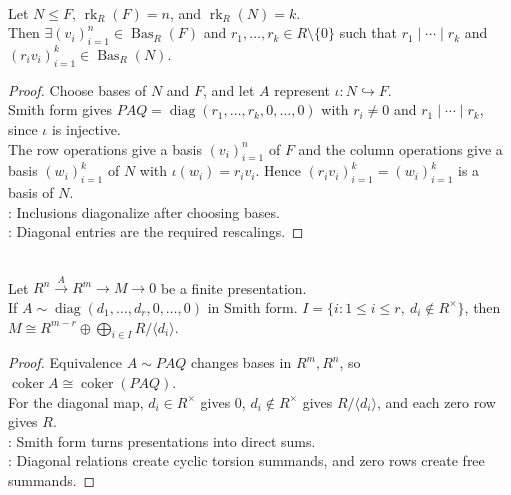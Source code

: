 \begin{theorem} \label{thm:adapted-basis-submodule-free-pid} \\
Let $N\leq F$, $\operatorname{rk}_R(F)=n$, and $\operatorname{rk}_R(N)=k$.\\
Then $\exists(v_i)_{i=1}^n\in\operatorname{Bas}_R(F)$ and $r_1,\ldots,r_k\in R\setminus\{0\}$ such that $r_1\mid\cdots\mid r_k$ and $(r_iv_i)_{i=1}^k\in\operatorname{Bas}_R(N)$.
\begin{proof}
Choose bases of $N$ and $F$, and let $A$ represent $\iota:N\hookrightarrow F$.\\
Smith form gives $PAQ=\operatorname{diag}(r_1,\ldots,r_k,0,\ldots,0)$ with $r_i\neq0$ and $r_1\mid\cdots\mid r_k$, since $\iota$ is injective.\\
The row operations give a basis $(v_i)_{i=1}^n$ of $F$ and the column operations give a basis $(w_i)_{i=1}^k$ of $N$ with $\iota(w_i)=r_iv_i$. Hence $(r_iv_i)_{i=1}^k=(w_i)_{i=1}^k$ is a basis of $N$.\\
: Inclusions diagonalize after choosing bases.\\
: Diagonal entries are the required rescalings.
\end{proof}
\end{theorem}

\begin{corollary} \label{cor:smith-normal-form-presents-pid-modules} \\
Let $R^n\xrightarrow{A}R^m\to M\to0$ be a finite presentation.\\
If $A\sim\operatorname{diag}(d_1,\ldots,d_r,0,\ldots,0)$ in Smith form. $I=\{i:1\leq i\leq r,\ d_i\notin R^\times\}$, then $M\cong R^{m-r}\oplus\bigoplus_{i\in I}R/\langle d_i\rangle$.
\begin{proof}
Equivalence $A\sim PAQ$ changes bases in $R^m,R^n$, so $\operatorname{coker}A\cong\operatorname{coker}(PAQ)$.\\
For the diagonal map, $d_i\in R^\times$ gives $0$, $d_i\notin R^\times$ gives $R/\langle d_i\rangle$, and each zero row gives $R$.\\
: Smith form turns presentations into direct sums.\\
: Diagonal relations create cyclic torsion summands, and zero rows create free summands.
\end{proof}
\end{corollary}

